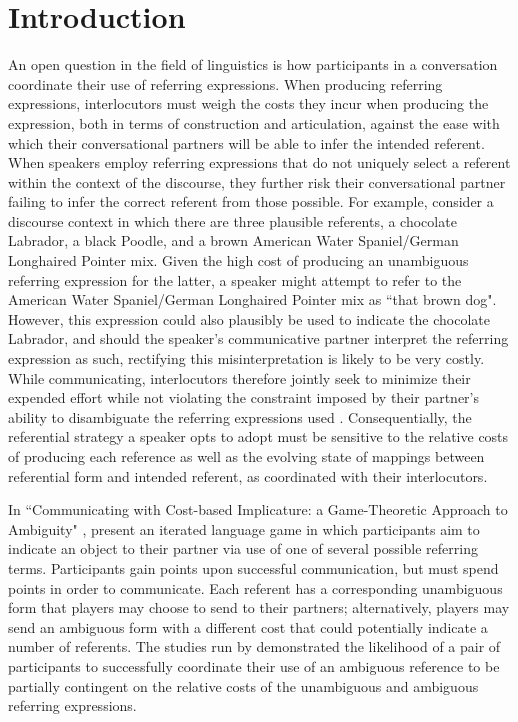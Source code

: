 \documentclass[12pt,a4paper]{article}
\begin{document}
\pagebreak


\tableofcontents

\pagebreak


\section{Introduction}
An open question in the field of linguistics is how participants in a conversation coordinate their use of referring expressions. When producing referring expressions, interlocutors must weigh the costs they incur when producing the expression, both in terms of construction and articulation, against the ease with which their conversational partners will be able to infer the intended referent. When speakers employ referring expressions that do not uniquely select a referent within the context of the discourse, they further risk their conversational partner failing to infer the correct referent from those possible. For example, consider a discourse context in which there are three plausible referents, a chocolate Labrador, a black Poodle, and a brown American Water Spaniel/German Longhaired Pointer mix. Given the high cost of producing an unambiguous referring expression for the latter, a speaker might attempt to refer to the American Water Spaniel/German Longhaired Pointer mix as ``that brown dog". However, this expression could also plausibly be used to indicate the chocolate Labrador, and should the speaker's communicative partner interpret the referring expression as such, rectifying this misinterpretation is likely to be very costly. While communicating, interlocutors therefore jointly seek to minimize their expended effort while not violating the constraint imposed by their partner's ability to disambiguate the referring expressions used \citep[p.~65-66]{benz2005}. Consequentially, the referential strategy a speaker opts to adopt must be sensitive to the relative costs of producing each reference as well as the evolving state of mappings between referential form and intended referent, as coordinated with their interlocutors. 

In ``Communicating with Cost-based Implicature: a Game-Theoretic Approach to Ambiguity" \citeyearpar{rohde2012}, \citeauthor{rohde2012} present an iterated language game in which participants aim to indicate an object to their partner via use of one of several possible referring terms. Participants gain points upon successful communication, but must spend points in order to communicate. Each referent has a corresponding unambiguous form that players may choose to send to their partners; alternatively, players may send an ambiguous form with a different cost that could potentially indicate a number of referents. The studies run by \citeauthor{rohde2012} demonstrated the likelihood of a pair of participants to successfully coordinate their use of an ambiguous reference to be partially contingent on the relative costs of the unambiguous and ambiguous referring expressions.
\end{document}
